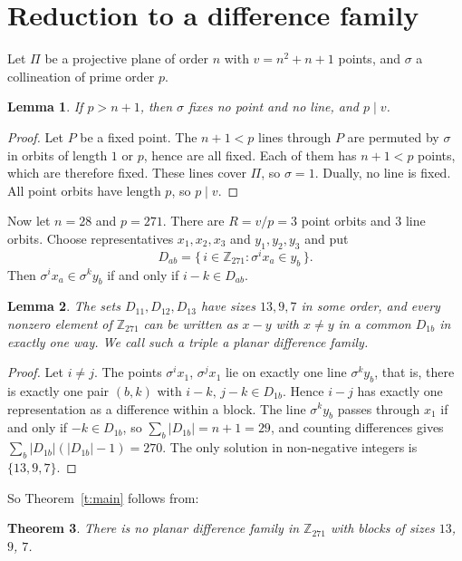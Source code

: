 \documentclass[11pt,a4paper]{article}
\newtheorem{theorem}{Theorem}
\newtheorem{lemma}[theorem]{Lemma}
\theoremstyle{remark}
\newcommand{\Zp}{\mathbb{Z}_{271}}
\begin{document}
\section{Reduction to a difference family}

Let $\Pi$ be a projective plane of order $n$ with $v=n^2+n+1$ points, and $\sigma$ a collineation of prime order $p$.

\begin{lemma}\label{l:fpf}
If $p>n+1$, then $\sigma$ fixes no point and no line, and $p\mid v$.
\end{lemma}
\begin{proof}
Let $P$ be a fixed point. The $n+1<p$ lines through $P$ are permuted by $\sigma$ in orbits of length $1$ or $p$, hence are all fixed. Each of them has $n+1<p$ points, which are therefore fixed. These lines cover $\Pi$, so $\sigma=1$. Dually, no line is fixed. All point orbits have length $p$, so $p\mid v$.
\end{proof}

Now let $n=28$ and $p=271$. There are $R=v/p=3$ point orbits and $3$ line orbits. Choose representatives $x_1,x_2,x_3$ and $y_1,y_2,y_3$ and put
\[
D_{ab}=\{\,i\in\Zp : \sigma^i x_a\in y_b\,\}.
\]
Then $\sigma^i x_a\in\sigma^k y_b$ if and only if $i-k\in D_{ab}$.

\begin{lemma}\label{l:fam}
The sets $D_{11},D_{12},D_{13}$ have sizes $13,9,7$ in some order, and every nonzero element of $\Zp$ can be written as $x-y$ with $x\ne y$ in a common $D_{1b}$ in exactly one way. We call such a triple a \emph{planar difference family}.
\end{lemma}
\begin{proof}
Let $i\ne j$. The points $\sigma^ix_1$, $\sigma^jx_1$ lie on exactly one line $\sigma^ky_b$, that is, there is exactly one pair $(b,k)$ with $i-k,\,j-k\in D_{1b}$. Hence $i-j$ has exactly one representation as a difference within a block. The line $\sigma^ky_b$ passes through $x_1$ if and only if $-k\in D_{1b}$, so $\sum_b|D_{1b}|=n+1=29$, and counting differences gives $\sum_b|D_{1b}|(|D_{1b}|-1)=270$. The only solution in non-negative integers is $\{13,9,7\}$.
\end{proof}

So Theorem~\ref{t:main} follows from:

\begin{theorem}\label{t:fam}
There is no planar difference family in $\Zp$ with blocks of sizes $13$, $9$, $7$.
\end{theorem}
\end{document}

